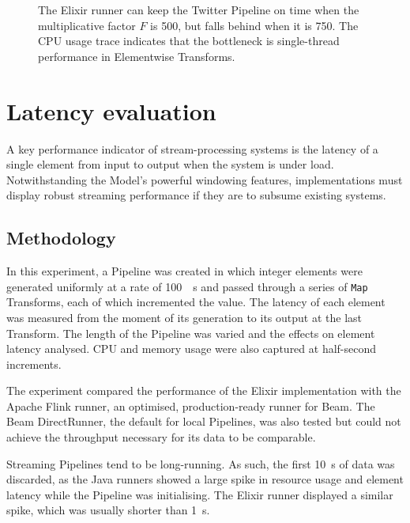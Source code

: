\begin{figure}
{		\label{fig:eval:twitter:throughput:750}
	}
	\caption[Watermark and CPU traces of the Elixir runner executing the Twitter Pipeline at two different values of the multiplicative factor.]{The Elixir runner can keep the Twitter Pipeline on time when the multiplicative factor $F$ is \num{500}, but falls behind when it is \num{750}. The CPU usage trace indicates that the bottleneck is single-thread performance in Elementwise Transforms.}
	\label{fig:eval:twitter:throughput}
\end{figure}


\section{Latency evaluation}\label{sec:eval:latency}

A key performance indicator of stream-processing systems is the latency of a single element from input to output when the system is under load.
Notwithstanding the Model's powerful windowing features, implementations must display robust streaming performance if they are to subsume existing systems.

\subsection{Methodology}

In this experiment, a Pipeline was created in which integer elements were generated uniformly at a rate of \SI{100}{\per\second} and passed through a series of \verb|Map| Transforms, each of which incremented the value.
The latency of each element was measured from the moment of its generation to its output at the last Transform.
The length of the Pipeline was varied and the effects on element latency analysed.
CPU and memory usage were also captured at half-second increments.

The experiment compared the performance of the Elixir implementation with the Apache Flink runner, an optimised, production-ready runner for Beam.
The Beam DirectRunner, the default for local Pipelines, was also tested but could not achieve the throughput necessary for its data to be comparable.

Streaming Pipelines tend to be long-running. As such, the first \SI{10}{\second} of data was discarded, as the Java runners showed a large spike in resource usage and element latency while the Pipeline was initialising.
The Elixir runner displayed a similar spike, which was usually shorter than \SI{1}{\second}.

